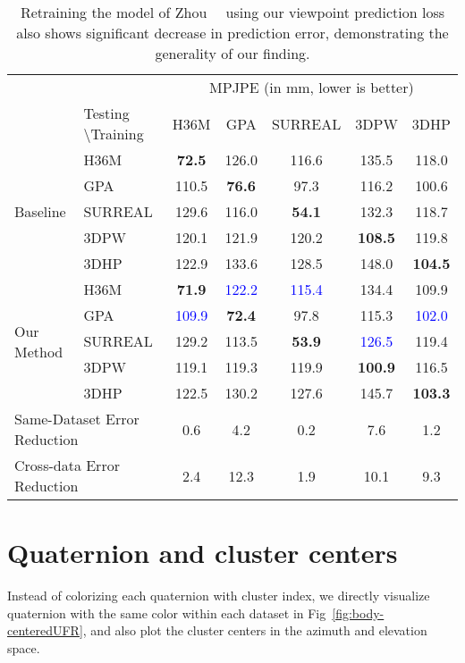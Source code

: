 \documentclass[runningheads]{llncs}
\begin{document}
\begin{table}[t]
\begin{center}
{\scriptsize
\begin{tabular}{@{}ll c c c c c@{}}
\toprule
 & &\multicolumn{5}{c}{MPJPE (in mm, lower is better)} \\
 & Testing \textbackslash Training & H36M & GPA & SURREAL & 3DPW & 3DHP  \\
\hline
\multirow{5}{*}{Baseline} & H36M & \textbf{72.5} & 126.0 & 116.6 & 135.5  & 118.0\\
&GPA & 110.5 & \textbf{76.6} & 97.3 & 116.2 & 100.6 \\
&SURREAL & 129.6 & 116.0 & \textbf{54.1} & 132.3 & 118.7 \\
&3DPW & 120.1 & 121.9 & 120.2 & \textbf{108.5} & 119.8 \\
&3DHP & 122.9 & 133.6 & 128.5 & 148.0 &  \textbf{104.5} \\
\hline
\multirow{5}{*}{Our Method} & H36M & \textbf{71.9} & \textcolor{blue}{122.2} & \textcolor{blue}{115.4} & 134.4 & 109.9  \\
& GPA & \textcolor{blue}{109.9} & \textbf{72.4} & 97.8 & 115.3 & \textcolor{blue}{102.0}  \\
& SURREAL & 129.2 & 113.5 & \textbf{53.9} & \textcolor{blue}{126.5} & 119.4\\
& 3DPW & 119.1 & 119.3 & 119.9 & \textbf{100.9} & 116.5  \\
& 3DHP & 122.5 & 130.2 & 127.6 & 145.7 & \textbf{103.3} \\
\hline
\multicolumn{2}{l}{Same-Dataset Error Reduction } & 0.6 & 4.2 & 0.2 & 7.6 & 1.2 \\
\multicolumn{2}{l}{Cross-data Error Reduction } & 2.4 & 12.3 & 1.9 & 10.1 & 9.3\\

\bottomrule
\end{tabular}
}
\end{center}
\caption{Retraining the model of Zhou~\etal~\cite{Zhou_2017_ICCV} using our viewpoint prediction
loss also shows significant decrease in prediction error, demonstrating the generality of
our finding.}
\label{table:mpjpesecond}
\vspace{-0.15in}
\end{table}


\section{Quaternion and cluster centers}
 Instead of colorizing each quaternion with cluster index, we directly visualize quaternion with the same color within each dataset in Fig~\ref{fig:body-centeredUFR}, and also plot the cluster centers in the azimuth and elevation space. 
\end{document}
